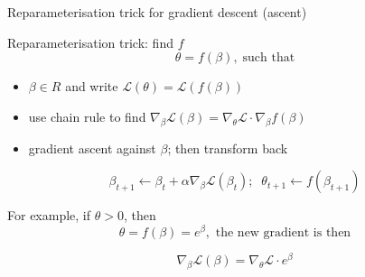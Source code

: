 \documentclass[ignorenonframetext,]{beamer}
\providecommand{\tightlist}{%
  \setlength{\itemsep}{0pt}\setlength{\parskip}{0pt}}
\begin{document}
\begin{frame}{Reparameterisation trick for gradient descent (ascent)}
\protect\hypertarget{reparameterisation-trick-for-gradient-descent-ascent}{}

Reparameterisation trick: find \(f\)
\[\theta = f(\beta), \; \text{such that}\]

\begin{itemize}
\tightlist
\item
  \(\beta \in R\) and write
  \(\mathcal{L}(\theta) = \mathcal{L}(f(\beta))\)
\item
  use chain rule to find
  \(\nabla_{\beta}\mathcal{L}(\beta) = \nabla_{\theta}\mathcal{L}\cdot\nabla_{\beta}f(\beta)\)
\item
  gradient ascent against \(\beta\); then transform back
\end{itemize}

\[
  \beta_{t+1} \leftarrow \beta_{t} + \alpha \nabla_{\beta}\mathcal{L}(\beta_t);\;\; \theta_{t+1} \leftarrow f(\beta_{t+1}) 
\]

\bigskip

For example, if \(\theta > 0\), then
\[\theta = f(\beta) = e^{\beta}, \text{ the new gradient is then}\]

\[\nabla_{\beta}\mathcal{L}(\beta) = \nabla_{\theta}\mathcal{L}\cdot e^{\beta}\]

\end{frame}
\end{document}

